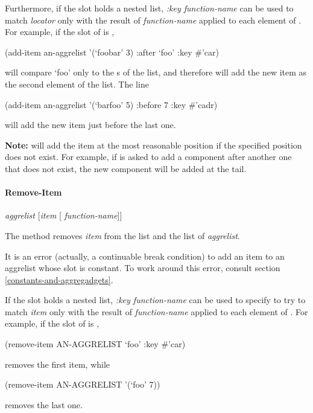 Furthermore, if the  slot holds a nested list, {\it :key
function-name} can be used to match {\it locator} only with the result
of {\it function-name} applied to each element of .
For example, if the  slot of  is
,
\begin{programexample}
(add-item an-aggrelist '(`foobar' 3) :after `foo' :key \#'car)
\end{programexample} will
compare `foo' only to the s of the list, and therefore will add
the new item as the second element of the list.  The line
\begin{programexample}
(add-item an-aggrelist '(`barfoo' 5) :before 7 :key \#'cadr)
\end{programexample}
will add the new item just before the last one.

{\bf Note:}  will add the item at the most reasonable position
if the specified position does not exist.  For example, if
 is asked to add a component after another
one that does not exist, the new component will be added at the tail.

\paragraph{Remove-Item}
 {\it aggrelist} [{\it item} [ {\it function-name}]] \value{Method}

The method  removes {\it item} from the  list and
the  list of {\it aggrelist}.

It is an error (actually, a continuable break condition) to add an
item to an aggrelist whose  slot is constant.  To work around
this error, consult section \ref{constants-and-aggregadgets}.

If the  slot holds a nested list, {\it :key function-name}
can be used to specify to try to match {\it item} only with the result
of {\it function-name} applied to each element of .
For example, if the  slot of  is
,
\begin{programexample}
(remove-item AN-AGGRELIST `foo' :key \#'car)
\end{programexample}
removes the first item, while
\begin{programexample}
(remove-item AN-AGGRELIST '(`foo' 7))
\end{programexample}
removes the last one.

